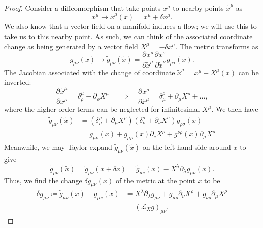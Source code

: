 \begin{proof}
  Consider a diffeomorphism that take points $x^{\mu}$ to nearby points $\widetilde{x}^{\mu}$ as
  \begin{equation}
    x^{\mu} \to \widetilde{x}^{\mu}(x) = x^{\mu} + \delta x^{\mu}.
  \end{equation}
  We also know that a vector field on a manifold induces a flow; we will use this to take us to this nearby point.
  As such, we can think of the associated coordinate change as being generated by a vector field $X^{\mu} = -\delta x^{\mu}$.
  The metric transforms as
  \begin{equation}
    g_{\mu\nu}(x) \to \widetilde{g}_{\mu\nu}(\widetilde{x}) = \frac{\partial^{} x^{\rho}}{\partial \widetilde{x}^{\mu}} \frac{\partial^{} x^{\sigma}}{\partial \widetilde{x}^{\nu}} g_{\rho\sigma} (x).
  \end{equation}
  The Jacobian associated with the change of coordinate $\tilde{x}^{\mu} = x^{\mu} - X^{\mu}(x)$ can be inverted:
  \begin{equation}
    \frac{\partial^{} \tilde{x}^{\mu}}{\partial x^{\rho}} = \delta^{\mu}_{\rho} - \partial_{\rho} X^{\mu} \quad \implies \quad \frac{\partial^{} x^{\rho}}{\partial \tilde{x}^{\mu}} = \delta^{\rho}_{\mu} + \partial_{\mu} X^{\rho} + \dots,
  \end{equation}
  where the higher order terms can be neglected for infinitesimal $X^{\mu}$.
  We then have
  \begin{align}
    \tilde{g}_{\mu\nu} (\tilde{x}) &= (\delta^{\rho}_{\mu} + \partial_{\mu} X^{\rho}) (\delta^{\sigma}_{\nu} + \partial_{\nu} X^{\sigma}) g_{\rho\sigma} (x) \\
				   &= g_{\mu\nu}(x) + g_{\mu\rho}(x) \partial_{\nu} X^{\rho} + g^{\nu\rho} (x) \partial_{\mu} X^{\rho}
  \end{align}
  Meanwhile, we may Taylor expand $\tilde{g}_{\mu\nu}(\tilde{x})$ on the left-hand side around $x$ to give
  \begin{equation}
  \widetilde{g}_{\mu\nu}(\tilde{x}) = \tilde{g}_{\mu\nu} (x + \delta x) = \widetilde{g}_{\mu\nu}(x) - X^{\lambda} \partial_{\lambda} g_{\mu\nu}(x).
  \end{equation}
  Thus, we find the change $\delta g_{\mu\nu}(x)$ of the metric at the point $x$ to be
  \begin{align}
    \delta g_{\mu\nu} \coloneqq \tilde{g}_{\mu\nu} (x) - g_{\mu\nu}(x) &= X^{\lambda} \partial_{\lambda} g_{\mu\nu} + g_{\mu\rho} \partial_{\nu} X^{\rho} + g_{\nu\rho} \partial_{\mu} X^{\rho} \\
	     &= (\mathcal{L}_X g)_{\mu\nu}.
  \end{align}
\end{proof}
